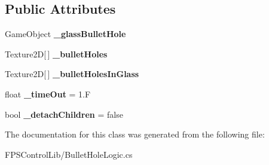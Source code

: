 \subsection*{Public Attributes}
\begin{DoxyCompactItemize}
\item 
\hypertarget{class_f_p_s_control_1_1_bullet_hole_logic_a73aedc164ed612cafbe3491771e7e2f5}{Game\-Object {\bfseries \-\_\-glass\-Bullet\-Hole}}\label{class_f_p_s_control_1_1_bullet_hole_logic_a73aedc164ed612cafbe3491771e7e2f5}

\item 
\hypertarget{class_f_p_s_control_1_1_bullet_hole_logic_a3e32f999eb5225cce1c502afcf023f11}{Texture2\-D\mbox{[}$\,$\mbox{]} {\bfseries \-\_\-bullet\-Holes}}\label{class_f_p_s_control_1_1_bullet_hole_logic_a3e32f999eb5225cce1c502afcf023f11}

\item 
\hypertarget{class_f_p_s_control_1_1_bullet_hole_logic_ab69eb64a85dc8b46d77207cde95697b2}{Texture2\-D\mbox{[}$\,$\mbox{]} {\bfseries \-\_\-bullet\-Holes\-In\-Glass}}\label{class_f_p_s_control_1_1_bullet_hole_logic_ab69eb64a85dc8b46d77207cde95697b2}

\item 
\hypertarget{class_f_p_s_control_1_1_bullet_hole_logic_a619627b904a9b4759ccb06c169f59838}{float {\bfseries \-\_\-time\-Out} = 1.\-F}\label{class_f_p_s_control_1_1_bullet_hole_logic_a619627b904a9b4759ccb06c169f59838}

\item 
\hypertarget{class_f_p_s_control_1_1_bullet_hole_logic_a6e269a3438a633656d2c4db3cbd5f63e}{bool {\bfseries \-\_\-detach\-Children} = false}\label{class_f_p_s_control_1_1_bullet_hole_logic_a6e269a3438a633656d2c4db3cbd5f63e}

\end{DoxyCompactItemize}


The documentation for this class was generated from the following file\-:\begin{DoxyCompactItemize}
\item 
F\-P\-S\-Control\-Lib/Bullet\-Hole\-Logic.\-cs\end{DoxyCompactItemize}
